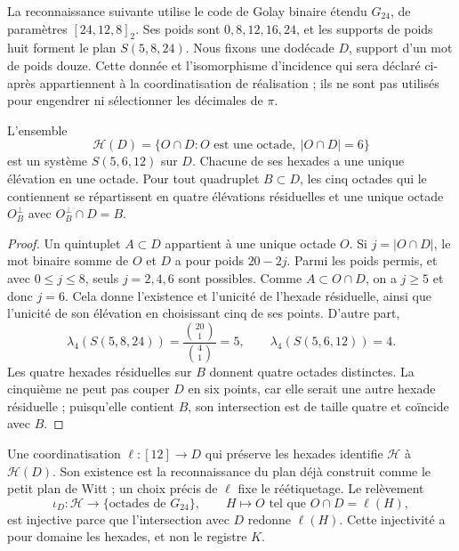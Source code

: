 La reconnaissance suivante utilise le code de Golay binaire
étendu $G_{24}$, de paramètres $[24,12,8]_2$. Ses poids sont
$0,8,12,16,24$, et les supports de poids huit forment le plan
$S(5,8,24)$. Nous fixons une dodécade $D$, support d'un mot de poids
douze. Cette donnée et l'isomorphisme d'incidence qui sera déclaré
ci-après appartiennent à la coordinatisation de réalisation ; ils ne sont pas utilisés pour
engendrer ni sélectionner les décimales de $\pi$.

\begin{proposition}
\label{exc:residuo-binario}
L'ensemble
\[
 \mathcal H(D)=
 \{O\cap D: O\text{ est une octade},\ |O\cap D|=6\}
\]
est un système $S(5,6,12)$ sur $D$. Chacune de ses hexades a une unique élévation en une octade. Pour tout quadruplet $B\subset D$, les cinq octades qui le contiennent se répartissent en quatre élévations résiduelles et une unique octade $O_B^\perp$ avec $O_B^\perp\cap D=B$.
\end{proposition}

\begin{proof}
Un quintuplet $A\subset D$ appartient à une unique octade $O$. Si
$j=|O\cap D|$, le mot binaire somme de $O$ et $D$ a pour poids
$20-2j$. Parmi les poids permis, et avec $0\leq j\leq8$, seuls
$j=2,4,6$ sont possibles. Comme $A\subset O\cap D$, on a $j\geq5$
et donc $j=6$. Cela donne l'existence et l'unicité de l'hexade
résiduelle, ainsi que l'unicité de son élévation en choisissant cinq de ses
points. D'autre part,
\[
 \lambda_4(S(5,8,24))=\frac{\binom{20}1}{\binom41}=5,
 \qquad
 \lambda_4(S(5,6,12))=4.
\]
Les quatre hexades résiduelles sur $B$ donnent quatre octades distinctes. La cinquième ne peut pas couper $D$ en six points, car elle serait une autre hexade résiduelle ; puisqu'elle contient $B$, son intersection est de taille quatre et coïncide avec $B$.
\end{proof}

Une coordinatisation $\ell:[12]\to D$ qui préserve les hexades identifie
$\mathcal H$ à $\mathcal H(D)$. Son existence est la reconnaissance
du plan déjà construit comme le petit plan de Witt ; un choix
précis de $\ell$ fixe le réétiquetage. Le relèvement
\[
 \iota_D:\mathcal H\longrightarrow
       \{\text{octades de }G_{24}\},
 \qquad H\longmapsto O\text{ tel que }O\cap D=\ell(H),
\]
est injective parce que l'intersection avec $D$ redonne $\ell(H)$. Cette injectivité a pour domaine les hexades, et non le registre $K$.

